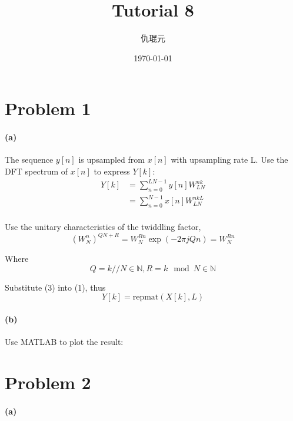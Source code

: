 \documentclass{article}
\begin{document}
\title{Tutorial 8}
\author{仇琨元}
\date{\today}
\maketitle

\section{Problem 1}

\paragraph{(a)}

The sequence \( y[n] \) is upsampled from \( x[n] \) with upsampling rate L. Use the DFT spectrum of \( x[n] \) to express \( Y[k] \):
\begin{equation}
	\begin{aligned}
		Y[k] & =\sum_{n=0}^{LN-1} y[n]W_{LN}^{nk}  \\
		     & =\sum_{n=0}^{N-1} x[n] W_{LN}^{nkL} \\
	\end{aligned}
\end{equation}

Use the unitary characteristics of the twiddling factor,
\begin{equation}
	(W_{N}^{n})^{QN+R}=W_{N}^{Rn}\exp(-2\pi jQn)=W_{N}^{Rn}
\end{equation}

Where
\begin{equation}
	Q=k//N\in \mathbb{N},R=k\mod N\in \mathbb{N}
\end{equation}

Substitute (3) into (1), thus
\begin{equation}
	Y[k]=\text{repmat}(X[k],L)
\end{equation}

\paragraph{(b)}

Use MATLAB to plot the result:
\begin{figure}[htpb]
	\centering
	
	\label{fig:p1}
\end{figure}

\section{Problem 2}
\paragraph{(a)}
\end{document}

